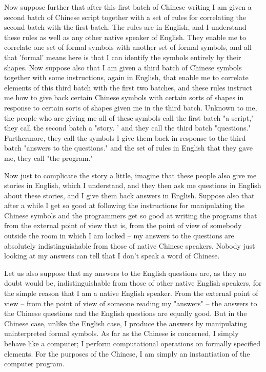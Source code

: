 Now suppose further that after this first batch of Chinese writing I am given a second batch of Chinese script
together with a set of rules for correlating the second batch with the first batch. The rules are in English, and I
understand these rules as well as any other native speaker of English. They enable me to correlate one set of
formal symbols with another set of formal symbols, and all that 'formal' means here is that I can identify the
symbols entirely by their shapes. Now suppose also that I am given a third batch of Chinese symbols together
with some instructions, again in English, that enable me to correlate elements of this third batch with the first two
batches, and these rules instruct me how to give back certain Chinese symbols with certain sorts of shapes in
response to certain sorts of shapes given me in the third batch. Unknown to me, the people who are giving me
all of these symbols call the first batch "a script," they call the second batch a "story. ' and they call the third
batch "questions." Furthermore, they call the symbols I give them back in response to the third batch "answers
to the questions." and the set of rules in English that they gave me, they call "the program."

Now just to complicate the story a little, imagine that these people also give me stories in English, which I
understand, and they then ask me questions in English about these stories, and I give them back answers in
English. Suppose also that after a while I get so good at following the instructions for manipulating the Chinese
symbols and the programmers get so good at writing the programs that from the external point of view that is,
from the point of view of somebody outside the room in which I am locked -- my answers to the questions are
absolutely indistinguishable from those of native Chinese speakers. Nobody just looking at my answers can tell
that I don't speak a word of Chinese.

Let us also suppose that my answers to the English questions are, as they no doubt would be, indistinguishable
from those of other native English speakers, for the simple reason that I am a native English speaker. From the
external point of view -- from the point of view of someone reading my "answers" -- the answers to the
Chinese questions and the English questions are equally good. But in the Chinese case, unlike the English case,
I produce the answers by manipulating uninterpreted formal symbols. As far as the Chinese is concerned, I
simply behave like a computer; I perform computational operations on formally specified elements. For the
purposes of the Chinese, I am simply an instantiation of the computer program.

